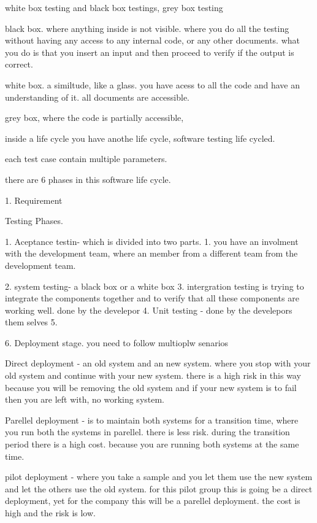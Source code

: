 \documentclass[a4paper]{article}
\begin{document}
white box testing and black box testings, grey box testing 

black box. where anything inside is not visible. where you do all the testing without having any access to any internal code, or any other documents.
what you do is that you insert an input and then proceed to verify if the output is correct.



white box. a similtude, like a glass. you have acess to all the code and have an understanding of it. all documents are accessible.

grey box, where the code is partially accessible, 

inside a life cycle you have anothe life cycle, software testing life cycled.

each test case contain multiple parameters.
  
there are 6 phases in this software life cycle.

1. Requirement 


Testing Phases. 

1. Aceptance testin- which is divided into two parts.
    1. you have an involment with the development team, where an member from a different team from the development team.

2. system testing- a black box or a white box 
3. intergration testing is trying to integrate the components together and to verify that all these components are working well. done by the develepor
4. Unit testing - done by the develepors them selves
5.

6. Deployment stage.
 you need to follow multioplw senarios

Direct deployment - an old system and an new system. where you stop with your old system and continue with your new system.
there is a high risk in this way because you will be removing the old system and if your new system is to fail then you are left with, 
no working system.

Parellel deployment - is to maintain both systems for a transition time, where you run both the systems in parellel.
there is less risk. during the transition period there is a high cost. because you are running both systems at the same time.

pilot deployment - where you take a sample and you let them use the new system and let the others use the old system. for this pilot group this is 
going be a direct deployment, yet for the company this will be a parellel deployment. 
the cost is high and the risk is low.
\end{document}
